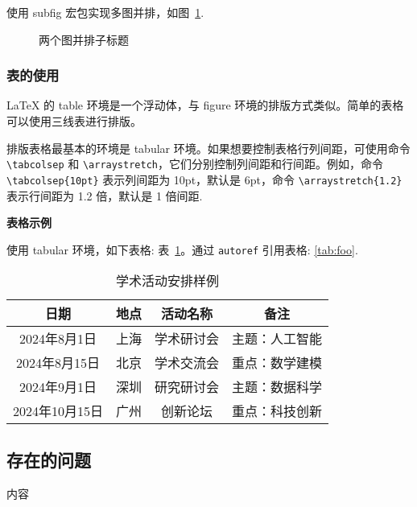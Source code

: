 \documentclass[YF]{nsfc}
\begin{document}
使用 subfig 宏包实现多图并排，如图~\ref{fig:images}.
\begin{figure}[htp!]
\centering
{}
\hfill
{}
\caption{两个图并排子标题}
\label{fig:images}
\end{figure}

\subsubsection{表的使用}

LaTeX 的 table 环境是一个浮动体，与 figure 环境的排版方式类似。简单的表格可以使用三线表进行排版。

排版表格最基本的环境是 tabular 环境。如果想要控制表格行列间距，可使用命令 \verb|\tabcolsep| 和 \verb|\arraystretch|，它们分别控制列间距和行间距。例如，命令 \verb|\tabcolsep{10pt}| 表示列间距为 10pt，默认是 6pt，命令 \verb|\arraystretch{1.2}| 表示行间距为 1.2 倍，默认是 1 倍间距.

\textbf{表格示例}

使用 tabular 环境，如下表格: 表~\ref{tab:foo}。通过 \verb|autoref| 引用表格: \autoref{tab:foo}.

\begin{table}[htp!]
\centering
\setlength{\tabcolsep}{12pt}  %
\renewcommand{\arraystretch}{1.2}
\caption{学术活动安排样例}
\label{tab:foo}
\begin{tabular}{|c|c|c|c|}
\hline
\textbf{日期}  & \textbf{地点} & \textbf{活动名称} & \textbf{备注} \\ \hline
2024年8月1日      & 上海       & 学术研讨会      & 主题：人工智能 \\ \hline
2024年8月15日    & 北京       & 学术交流会      & 重点：数学建模 \\ \hline
2024年9月1日      & 深圳       & 研究研讨会      & 主题：数据科学 \\ \hline
2024年10月15日  & 广州       & 创新论坛         & 重点：科技创新 \\ \hline
\end{tabular}
\end{table}

\subsection{存在的问题}

内容

\renewcommand{\bibname}{\color{black}\normalfont\normalsize\bfseries 参考文献}
\end{document}
